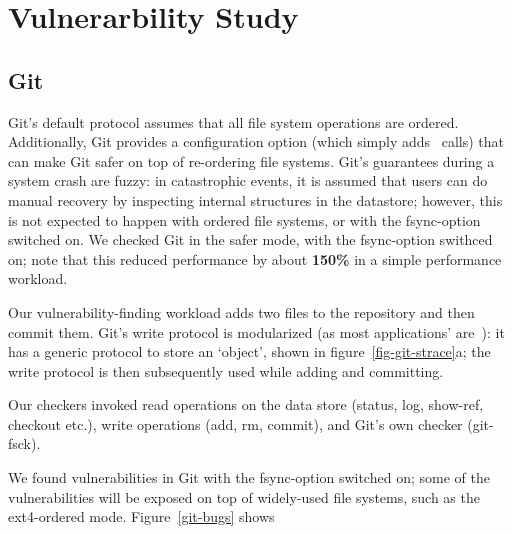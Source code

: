 \section{Vulnerarbility Study}
\label{study}
\subsection{Git}
Git's default protocol assumes that all file system operations are ordered. Additionally, Git provides a configuration option (which simply adds \fsyncSC\ calls) that can make Git safer on top of re-ordering file systems. Git's guarantees during a system crash are fuzzy: in catastrophic events, it is assumed that users can do manual recovery by inspecting internal structures in the datastore; however, this is not expected to happen with ordered file systems, or with the fsync-option switched on. We checked Git in the safer mode, with the fsync-option swithced on; note that this reduced performance by about \textbf{150\%} in a simple performance workload.

Our vulnerability-finding workload adds two files to the repository and then commit them. Git's write protocol is modularized (as most applications' are~\cite{tyler}): it has a generic protocol to store an `object', shown in figure~\ref{fig-git-strace}a; the write protocol is then subsequently used while adding and committing. 

 Our checkers invoked read operations on the data store (status, log, show-ref, checkout etc.), write operations (add, rm, commit), and Git's own checker (git-fsck). 

We found vulnerabilities in Git with the fsync-option switched on; some of the vulnerabilities will be exposed on top of widely-used file systems, such as the ext4-ordered mode. Figure~\ref{git-bugs} shows 

